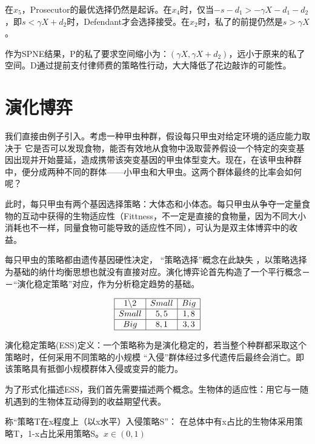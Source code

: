\documentclass[UTF8,12pt]{ctexart}
\numberwithin{equation}{section} %
\numberwithin{figure}{section}
\numberwithin{table}{section}
\begin{document}
	在$x_5$，Prosecutor的最优选择仍然是起诉。在$x_4$时，仅当$-s - d_1 > -\gamma X - d_1 - d_2$，即$s < \gamma X + d_2$时，Defendant才会选择接受。在$x_2$时，私了的前提仍然是$s > \gamma X$。
	
	作为SPNE结果，P的私了要求空间缩小为：$(\gamma X,\gamma X + d_2)$，远小于原来的私了空间。D通过提前支付律师费的策略性行动，大大降低了花边敲诈的可能性。


	
	\newpage
	
	\section{演化博弈}
	
	我们直接由例子引入。考虑一种甲虫种群，假设每只甲虫对给定环境的适应能力取决于 它是否可以发现食物，能否有效地从食物中汲取营养假设一个特定的突变基因出现并开始蔓延，造成携带该突变基因的甲虫体型变大。现在，在该甲虫种群中，便分成两种不同的群体——小甲虫和大甲虫。这两个群体最终的比率会如何呢？
	
	此时，每只甲虫有两个基因选择策略：大体态和小体态。每只甲虫从争夺一定量食物的互动中获得的生物适应性（Fittness，不一定是直接的食物量，因为不同大小消耗也不一样，同量食物可能导致的适应性不同），可认为是双主体博弈中的收益。
	
	每只甲虫的策略都由遗传基因硬性决定， “策略选择”概念在此缺失 ，以策略选择为基础的纳什均衡思想也就没有直接对应。演化博弈论首先构造了一个平行概念－－“演化稳定策略”对应，作为分析稳定趋势的基础。
	
	\begin{equation}
		\begin{array}{|c|c|c|}
			\hline
			1 \backslash 2 & Small & Big \\
			\hline
			Small & 5,5 & 1,8 \\
			\hline
			Big & 8,1 & 3,3 \\
			\hline
		\end{array}
	\end{equation}
	
	演化稳定策略(ESS)定义：一个策略称为是演化稳定的，若当整个种群都采取这个策略时，任何采用不同策略的小规模 “入侵”群体经过多代遗传后最终会消亡。即该策略具有抵御小规模群体入侵或变异的能力。
	
	为了形式化描述ESS，我们首先需要描述两个概念。生物体的适应性：用它与一随机遇到的生物体互动得到的收益期望代表。
	
	称“策略T在x程度上（以x水平）入侵策略S”： 在总体中有x占比的生物体采用策略T，1-x占比采用策略S。$x \in (0,1)$
	
\end{document}

